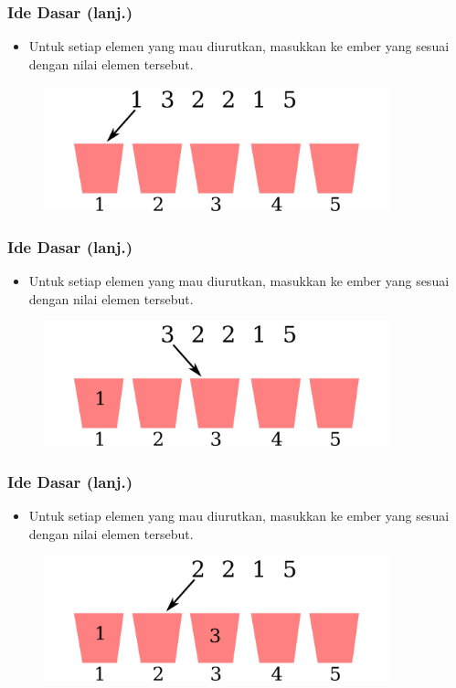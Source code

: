 \begin{frame}
\frametitle{Ide Dasar (lanj.)}
  \begin{itemize}
    \item Untuk setiap elemen yang mau diurutkan, masukkan ke ember yang
    sesuai dengan nilai elemen tersebut.
  \end{itemize}
  \begin{figure}
    \includegraphics[width=10cm]{asset/counting-sort-2.pdf}
  \end{figure}
\end{frame}

\begin{frame}
\frametitle{Ide Dasar (lanj.)}
  \begin{itemize}
    \item Untuk setiap elemen yang mau diurutkan, masukkan ke ember yang
    sesuai dengan nilai elemen tersebut.
  \end{itemize}
  \begin{figure}
    \includegraphics[width=10cm]{asset/counting-sort-3.pdf}
  \end{figure}
\end{frame}

\begin{frame}
\frametitle{Ide Dasar (lanj.)}
  \begin{itemize}
    \item Untuk setiap elemen yang mau diurutkan, masukkan ke ember yang
    sesuai dengan nilai elemen tersebut.
  \end{itemize}
  \begin{figure}
    \includegraphics[width=10cm]{asset/counting-sort-4.pdf}
  \end{figure}
\end{frame}

